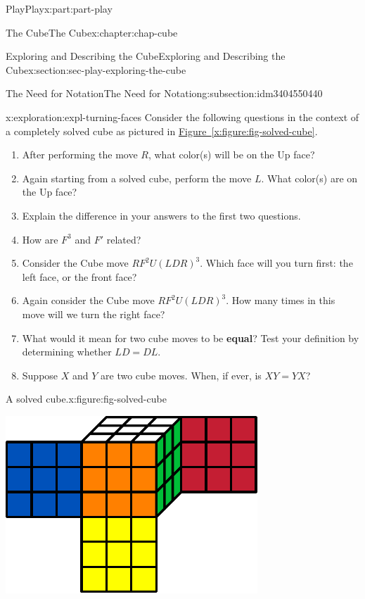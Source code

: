 \documentclass[oneside,10pt,]{book}
\newcommand{\xreffont}{\relax}
\newcommand{\terminology}[1]{\textbf{#1}}
\numberwithin{equation}{section}
\begin{document}
\begin{partptx}{Play}{}{Play}{}{}{x:part:part-play}
\begin{chapterptx}{The Cube}{}{The Cube}{}{}{x:chapter:chap-cube}
\begin{sectionptx}{Exploring and Describing the Cube}{}{Exploring and Describing the Cube}{}{}{x:section:sec-play-exploring-the-cube}
\begin{subsectionptx}{The Need for Notation}{}{The Need for Notation}{}{}{g:subsection:idm3404550440}
\begin{exploration}{}{x:exploration:expl-turning-faces}
Consider the following questions in the context of a completely solved cube as pictured in \hyperref[x:figure:fig-solved-cube]{Figure~{\xreffont\ref{x:figure:fig-solved-cube}}}.%
%
\begin{enumerate}
\item{}After performing the move \(R\), what color(s) will be on the Up face?%
\item{}Again starting from a solved cube, perform the move \(L\). What color(s) are on the Up face?%
\item{}Explain the difference in your answers to the first two questions.%
\item{}How are \(F^3\) and \(F'\) related?%
\item{}Consider the Cube move \(RF^2 U (LDR)^3\). Which face will you turn first: the left face, or the front face?%
\item{}Again consider the Cube move \(RF^2 U (LDR)^3\). How many times in this move will we turn the right face?%
\item{}What would it mean for two cube moves to be \terminology{equal}? Test your definition by determining whether \(LD = DL\).%
\item{}Suppose \(X\) and \(Y\) are two cube moves. When, if ever, is \(XY = YX\)?%
\end{enumerate}
\begin{figureptx}{A solved cube.}{x:figure:fig-solved-cube}{}%
\begin{image}{0.25}{0.5}{0.25}%
\includegraphics[width=\linewidth]{./images/solved_cube_sf.pdf}
\end{image}%
\tcblower
\end{figureptx}%
\end{exploration}%

\end{subsectionptx}
\end{sectionptx}
\end{chapterptx}
\end{partptx}
\end{document}
